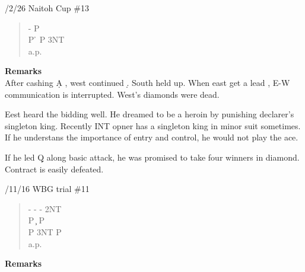 /2/26 Naitoh Cup \#13
\begin{quote}
%
  {}%
  {}
  {}%
  {}%
\end{quote}
\begin{quote}
\begin{bidding}
- \s  \> P \c \\
P \h \> P \> 3NT \\
a.p.
\end{bidding}
\end{quote}
{\bf Remarks}\\

After cashing \d A , west continued \d . South held up.
When east get a lead , E-W communication is interrupted.
West's diamonds were dead.

Eest heard the bidding well. He dreamed to be a heroin 
by punishing declarer's singleton king. Recently INT 
opner has a singleton king in minor suit sometimes.
If he understans the importance of entry and control,
he would not play the ace.

If he led \d Q along basic attack, he was promised to
take four winners in diamond. Contract is easily defeated.
 

\vspace{0.5cm}

/11/16 WBG trial  \#11
\begin{quote}
%
  {}%
  {}%
  {}%
  {}%
\end{quote}
\begin{quote}
\begin{bidding}
- \> -  \> - \> 2NT \\
P \c \> P \h \\
P \> 3NT \> P \s \\
a.p.
\end{bidding}
\end{quote}
{\bf Remarks}\\

